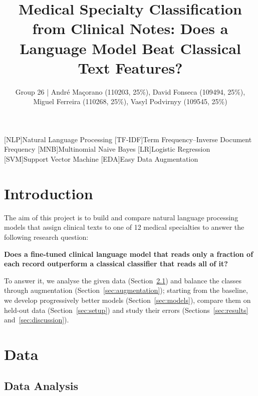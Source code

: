 \documentclass[twocolumn,10pt]{article}
\title{Medical Specialty Classification from Clinical Notes: Does a Language Model Beat Classical Text Features?}
\author{Group 26 | André Maçorano (110203, 25\%), David Fonseca (109494, 25\%), Miguel Ferreira (110268, 25\%), Vasyl Podvirnyy (109545, 25\%)}
\date{}
\begin{document}
\raggedbottom  %

\maketitle

[NLP]{Natural Language Processing}
[TF-IDF]{Term Frequency--Inverse Document Frequency}
[MNB]{Multinomial Naive Bayes}
[LR]{Logistic Regression}
[SVM]{Support Vector Machine}
[EDA]{Easy Data Augmentation}

\section{Introduction}
\label{sec:intro}

The aim of this project is to build and compare natural language processing models that assign clinical texts to one of 12 medical specialties to answer the following research question:

\smallskip
\noindent\colorbox{black!8}{\parbox{\dimexpr\columnwidth-2\fboxsep\relax}{\textbf{Does a fine-tuned clinical language model that reads only a fraction of each record outperform a classical classifier that reads all of it?}}}
\smallskip

To answer it, we analyse the given data (Section~\ref{sec:analysis}) and balance the classes through augmentation (Section~\ref{sec:augmentation}); starting from the baseline, we develop progressively better models (Section~\ref{sec:models}), compare them on held-out data (Section~\ref{sec:setup}) and study their errors (Sections~\ref{sec:results} and~\ref{sec:discussion}).

\section{Data}
\label{sec:data}

\subsection{Data Analysis}
\label{sec:analysis}
\end{document}
